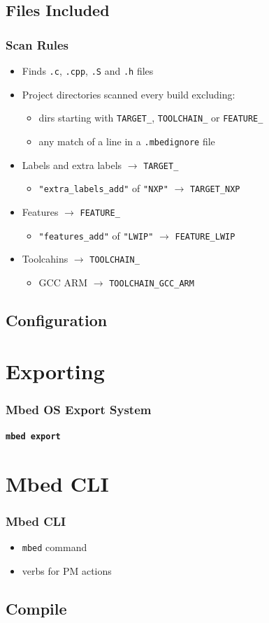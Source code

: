 \documentclass{beamer}
\begin{document}
\subsection{Files Included}
\begin{frame}
  \frametitle{Scan Rules}
  \begin{itemize}
  \item Finds \texttt{.c}, \texttt{.cpp}, \texttt{.S} and \texttt{.h} files
  \item Project directories scanned every build excluding:
    \begin{itemize}
     \item dirs starting with \texttt{TARGET\_}, \texttt{TOOLCHAIN\_} or \texttt{FEATURE\_}
    \item any match of a line in a \texttt{.mbedignore} file
    \end{itemize}
  \item Labels and extra labels $\rightarrow$ \texttt{TARGET\_}
    \begin{itemize}
    \item \texttt{"extra\_labels\_add"} of \texttt{"NXP"} $\rightarrow$ \texttt{TARGET\_NXP}
    \end{itemize}
  \item Features $\rightarrow$ \texttt{FEATURE\_}
    \begin{itemize}
    \item \texttt{"features\_add"} of \texttt{"LWIP"} $\rightarrow$ \texttt{FEATURE\_LWIP}
    \end{itemize}
  \item Toolcahins $\rightarrow$ \texttt{TOOLCHAIN\_}
    \begin{itemize}
    \item GCC ARM $\rightarrow$ \texttt{TOOLCHAIN\_GCC\_ARM}
    \end{itemize}
  \end{itemize}
\end{frame}
\subsection{Configuration}
\begin{frame}

\end{frame}
\section{Exporting}
\begin{frame}
  \frametitle{Mbed OS Export System}
  \framesubtitle{\texttt{mbed export}}
  \tableofcontents[currentsection]
\end{frame}
\section{Mbed CLI}
\begin{frame}
  \frametitle{Mbed CLI}
  \begin{itemize}
  \item \texttt{mbed} command
  \item verbs for PM actions
  \end{itemize}
\end{frame}
\subsection{Compile}
\begin{frame}
\end{frame}
\end{document}
